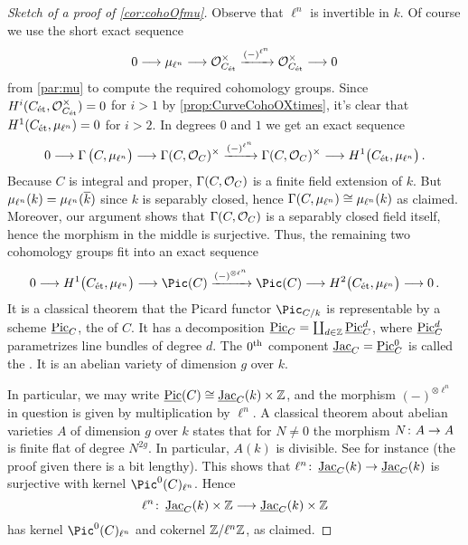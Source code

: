 \begin{proof}[Sketch of a proof of \cref{cor:cohoOfmu}]
	Observe that $\ell^n$ is invertible in $k$. Of course we use the short exact sequence
	\begin{equation*}
		0\morphism \mu_{\ell^n}\morphism \Oo_{C_\et}^\times\xrightarrow{(-)^{\ell^n}}\Oo_{C_\et}^\times\morphism 0
	\end{equation*}
	from \cref{par:mu} to compute the required cohomology groups. Since $H^i(C_{\mathrm{\acute{e}t}},\mathcal{O}_{C_{\mathrm{\acute{e}t}}}^\times)=0$ for $i>1$ by \cref{prop:CurveCohoOXtimes}, it's clear that $H^1(C_{\mathrm{\acute{e}t}},\mu_{\ell^n})=0$ for $i>2$. In degrees $0$ and $1$ we get an exact sequence 
	\begin{equation*}
		0\morphism \Global\big(C,\mu_{\ell^n}\big)\morphism\Global(C,\Oo_C)^\times\xrightarrow{(-)^{\ell^n}} \Global(C,\Oo_C)^\times \morphism H^1\big(C_\et,\mu_{\ell^n}\big)\,.
	\end{equation*}
	Because $C$ is integral and proper, $\operatorname{\Gamma}(C,\mathcal{O}_C)$ is a finite field extension of $k$. But $\mu_{\ell^n}(k)=\mu_{\ell^n}(\ov{k})$ since $k$ is separably closed, hence $\operatorname{\Gamma}(C,\mu_{\ell^n})\cong \mu_{\ell^n}(k)$ as claimed. Moreover, our argument shows that $\operatorname{\Gamma}(C,\mathcal{O}_C)$ is a separably closed field itself, hence the morphism in the middle is surjective. Thus, the remaining two cohomology groups fit into an exact sequence
	\begin{equation*}
		0\morphism H^1\big(C_\et,\mu_{\ell^n}\big)\morphism \Pic(C)\xrightarrow{(-)^{\otimes \ell^n}}\Pic(C)\morphism H^2\big(C_\et,\mu_{\ell^n}\big)\morphism 0\,.
	\end{equation*}
	It is a classical theorem that the Picard functor $\Pic_{C/k}$ is representable by a scheme $\operatorname{\underline{\smash{\mathrm{Pic}}}}_C$, the  of $C$. It has a decomposition $\operatorname{\underline{\smash{\mathrm{Pic}}}}_C=\coprod_{d\in \mathbb{Z}}\operatorname{\underline{\smash{\mathrm{Pic}}}}^d_C$, where $\operatorname{\underline{\smash{\mathrm{Pic}}}}^d_C$ parametrizes line bundles of degree $d$. The $0^{\text{th}}$ component $\operatorname{\underline{\smash{\mathrm{Jac}}}}_C= \operatorname{\underline{\smash{\mathrm{Pic}}}}^0_C$ is called the . It is an abelian variety of dimension $g$ over $k$.
	
	In particular, we may write $\operatorname{\underline{\smash{\mathrm{Pic}}}}(C)\cong \operatorname{\underline{\smash{\mathrm{Jac}}}}_C(k)\times \mathbb{Z}$, and the morphism $(-)^{\otimes \ell^n}$ in question is given by multiplication by $\ell^n$. A classical theorem about abelian varieties $A$ of dimension $g$ over $k$ states that for $N\neq 0$ the morphism $N\colon A\morphism A$ is finite flat of degree $N^{2g}$. In particular, $A(k)$ is divisible. See \cite[Theorem~10]{jacobians} for instance (the proof given there is a bit lengthy). This shows that $\ell^n\colon \JAC_C(k)\morphism\JAC_C(k)$ is surjective with kernel $\Pic^0(C)_{\ell^n}$. Hence 
	\begin{equation*}
		\ell^n\colon \JAC_C(k)\times \IZ\morphism\JAC_C(k)\times \IZ
	\end{equation*}
	has kernel $\Pic^0(C)_{\ell^n}$ and cokernel $\mathbb{Z}/\ell^n\mathbb{Z}$, as claimed.
	

\end{proof}
